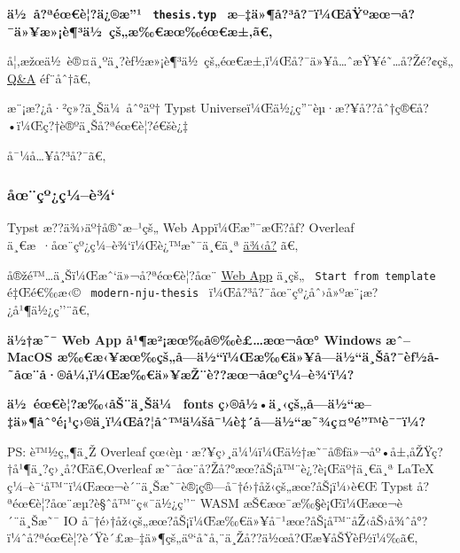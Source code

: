 \textbf{ä½~å?ªéœ€è¦?ä¿®æ''¹ \texttt{\ thesis.typ\ }
æ--‡ä»¶å?³å?¯ï¼ŒåŸºæœ¬å?¯ä»¥æ»¡è¶³ä½~çš„æ‰€æœ‰éœ€æ±‚ã€‚}

å¦‚æžœä½~è®¤ä¸ºä¸?èƒ½æ»¡è¶³ä½~çš„éœ€æ±‚ï¼Œå?¯ä»¥å\ldots ˆæŸ¥é˜\ldots å?Žé?¢çš„
\href{https://github.com/typst/packages/raw/main/packages/preview/modern-nju-thesis/0.3.4/\#Q\%26A}{Q\&A}
éƒ¨åˆ†ã€‚

æ¨¡æ?¿å·²ç»?ä¸Šä¼~åˆ°äº† Typst
Universeï¼Œä½¿ç''¨èµ·æ?¥å??åˆ†ç®€å?•ï¼Œç?†è®ºä¸Šå?ªéœ€è¦?é€šè¿‡

\begin{Shaded}
\begin{Highlighting}[]
\end{Highlighting}
\end{Shaded}

å¯¼å\ldots¥å?³å?¯ã€‚

\subsubsection{åœ¨çº¿ç¼--è¾`}\label{uxe5ux153uxe7uxbauxe7uxbcuxe8uxbe}

Typst æ??ä¾›äº†å®˜æ--¹çš„ Web Appï¼Œæ''¯æŒ?åƒ? Overleaf
ä¸€æ~·åœ¨çº¿ç¼--è¾`ï¼Œè¿™æ˜¯ä¸€ä¸ª
\href{https://typst.app/project/rgiwHIjdPOnXr9HJb8H0oa}{ä¾‹å­?} ã€‚

å®žé™\ldots ä¸Šï¼Œæˆ`ä»¬å?ªéœ€è¦?åœ¨
\href{https://typst.app/?template=modern-nju-thesis&version=0.3.4}{Web
App} ä¸­çš„ \texttt{\ Start\ from\ template\ } é‡Œé€‰æ‹©
\texttt{\ modern-nju-thesis\ } ï¼Œå?³å?¯åœ¨çº¿åˆ›å»ºæ¨¡æ?¿å¹¶ä½¿ç''¨ã€‚



\textbf{ä½†æ˜¯ Web App å¹¶æ²¡æœ‰å®‰è£\ldots æœ¬åœ° Windows æˆ-- MacOS
æ‰€æ‹¥æœ‰çš„å­---ä½``ï¼Œæ‰€ä»¥å­---ä½``ä¸Šå?¯èƒ½å­˜åœ¨å·®å¼‚ï¼Œæ‰€ä»¥æŽ¨è??æœ¬åœ°ç¼--è¾`ï¼?}

\textbf{ä½~éœ€è¦?æ‰‹åŠ¨ä¸Šä¼~ fonts
ç›®å½•ä¸‹çš„å­---ä½``æ--‡ä»¶åˆ°é¡¹ç›®ä¸­ï¼Œå?¦åˆ™ä¼šå¯¼è‡´å­---ä½``æ˜¾ç¤ºé''™è¯¯ï¼?}

PS: è™½ç„¶ä¸Ž Overleaf
çœ‹èµ·æ?¥ç›¸ä¼¼ï¼Œä½†æ˜¯å®ƒä»¬åº•å±‚åŽŸç?†å¹¶ä¸?ç›¸å?Œã€‚Overleaf
æ˜¯åœ¨å?Žå?°æœ?åŠ¡å™¨è¿?è¡Œäº†ä¸€ä¸ª LaTeX
ç¼--è¯`å™¨ï¼Œæœ¬è´¨ä¸Šæ˜¯è®¡ç®---å¯†é›†åž‹çš„æœ?åŠ¡ï¼›è€Œ Typst
å?ªéœ€è¦?åœ¨æµ?è§ˆå™¨ç«¯ä½¿ç''¨ WASM æŠ€æœ¯æ‰§è¡Œï¼Œæœ¬è´¨ä¸Šæ˜¯ IO
å¯†é›†åž‹çš„æœ?åŠ¡ï¼Œæ‰€ä»¥å¯¹æœ?åŠ¡å™¨åŽ‹åŠ›å¾ˆå°?ï¼ˆå?ªéœ€è¦?è´Ÿè´£æ--‡ä»¶çš„äº`å­˜å‚¨ä¸Žå??ä½œå?Œæ­¥åŠŸèƒ½ï¼‰ã€‚

